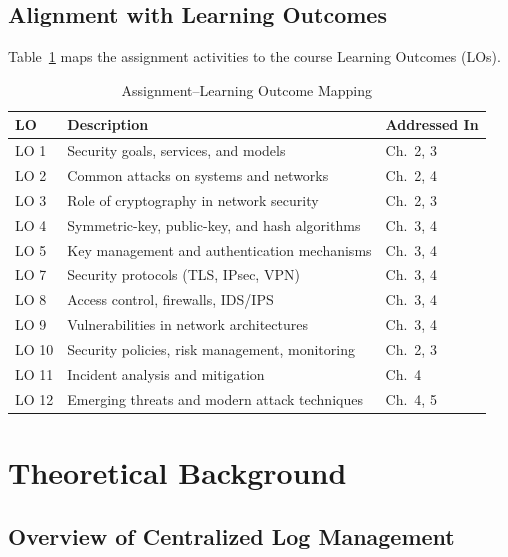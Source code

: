 \documentclass[12pt,a4paper]{report}
\begin{document}
\section{Alignment with Learning Outcomes}

Table~\ref{tab:lo-mapping} maps the assignment activities to the course Learning Outcomes (LOs).

\begin{table}[H]
\centering
\caption{Assignment--Learning Outcome Mapping}
\label{tab:lo-mapping}
\begin{tabularx}{\textwidth}{lXl}
\toprule
\textbf{LO} & \textbf{Description} & \textbf{Addressed In} \\
\midrule
LO 1  & Security goals, services, and models              & Ch.\ 2, 3 \\
LO 2  & Common attacks on systems and networks            & Ch.\ 2, 4 \\
LO 3  & Role of cryptography in network security          & Ch.\ 2, 3 \\
LO 4  & Symmetric-key, public-key, and hash algorithms    & Ch.\ 3, 4 \\
LO 5  & Key management and authentication mechanisms      & Ch.\ 3, 4 \\
LO 7  & Security protocols (TLS, IPsec, VPN)              & Ch.\ 3, 4 \\
LO 8  & Access control, firewalls, IDS/IPS                & Ch.\ 3, 4 \\
LO 9  & Vulnerabilities in network architectures          & Ch.\ 3, 4 \\
LO 10 & Security policies, risk management, monitoring    & Ch.\ 2, 3 \\
LO 11 & Incident analysis and mitigation                  & Ch.\ 4 \\
LO 12 & Emerging threats and modern attack techniques     & Ch.\ 4, 5 \\
\bottomrule
\end{tabularx}
\end{table}


\chapter{Theoretical Background}
\label{chap:theory}

\section{Overview of Centralized Log Management}
\end{document}
